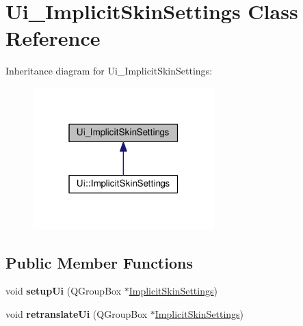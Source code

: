 \hypertarget{classUi__ImplicitSkinSettings}{}\section{Ui\+\_\+\+Implicit\+Skin\+Settings Class Reference}
\label{classUi__ImplicitSkinSettings}


Inheritance diagram for Ui\+\_\+\+Implicit\+Skin\+Settings\+:\nopagebreak
\begin{figure}[H]
\begin{center}
\leavevmode
\includegraphics[width=199pt]{d7/dd1/classUi__ImplicitSkinSettings__inherit__graph}
\end{center}
\end{figure}
\subsection*{Public Member Functions}
\begin{DoxyCompactItemize}
\item 
void {\bfseries setup\+Ui} (Q\+Group\+Box $\ast$\hyperlink{classImplicitSkinSettings}{Implicit\+Skin\+Settings})\hypertarget{classUi__ImplicitSkinSettings_abd744cc1ab6638b4b585ab8f6022e214}{}\label{classUi__ImplicitSkinSettings_abd744cc1ab6638b4b585ab8f6022e214}

\item 
void {\bfseries retranslate\+Ui} (Q\+Group\+Box $\ast$\hyperlink{classImplicitSkinSettings}{Implicit\+Skin\+Settings})\hypertarget{classUi__ImplicitSkinSettings_a8d5805215a1a2d44443b20b796af7e6b}{}\label{classUi__ImplicitSkinSettings_a8d5805215a1a2d44443b20b796af7e6b}

\end{DoxyCompactItemize}
